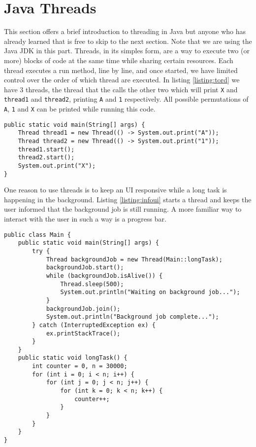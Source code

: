 \graphicspath{{./lab02/}}


\maketocpage

\section{Java Threads}
This section offers a brief introduction to threading in Java but anyone who has already learned that is free to skip to the next section. Note that we are using the Java JDK in this part. Threads, in its simples form, are a way to execute two (or more) blocks of code at the same time while sharing certain resources. Each thread executes a run method, line by line, and once started, we have limited control over the order of which thread are executed. In listing \ref{listing:tord} we have 3 threads, the thread that the calls the other two which will print \texttt{X} and \texttt{thread1} and \texttt{thread2}, printing \texttt{A} and \texttt{1} respectively. All possible permutations of \texttt{A}, \texttt{1} and \texttt{X} can be printed while running this code.

\begin{lstlisting}[style=A_Java, caption={Order of thread execution}, label={listing:tord}]
public static void main(String[] args) {
    Thread thread1 = new Thread(() -> System.out.print("A"));
    Thread thread2 = new Thread(() -> System.out.print("1"));
    thread1.start();
    thread2.start();
    System.out.print("X");
}
\end{lstlisting}

One reason to use threads is to keep an UI responsive while a long task is happening in the background. Listing \ref{listing:infoui} starts a thread and keeps the user informed that the background job is still running. A more familiar way to interact with the user in such a way is a progress bar.

\begin{lstlisting}[style=A_Java, caption={UI keeping user informed on progress}, label={listing:infoui}]
public class Main {
    public static void main(String[] args) {
        try {
            Thread backgroundJob = new Thread(Main::longTask);
            backgroundJob.start();
            while (backgroundJob.isAlive()) {
                Thread.sleep(500);
                System.out.println("Waiting on background job...");
            }
            backgroundJob.join();
            System.out.println("Background job complete...");
        } catch (InterruptedException ex) {
            ex.printStackTrace();
        }
    }
    public static void longTask() {
        int counter = 0, n = 30000;
        for (int i = 0; i < n; i++) {
            for (int j = 0; j < n; j++) {
                for (int k = 0; k < n; k++) {
                    counter++;
                }
            }
        }
    }
}
\end{lstlisting}

